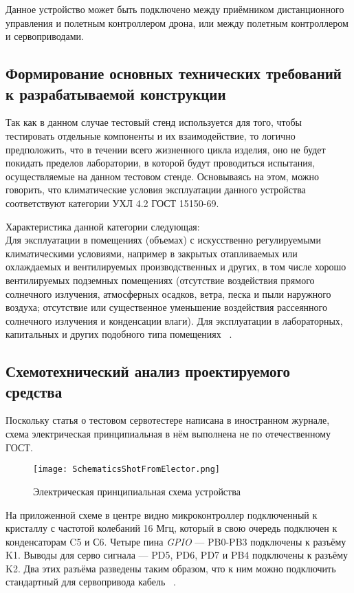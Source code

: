 Данное устройство может быть подключено между приёмником
дистанционного управления и полетным контроллером дрона, или между
полетным контроллером и сервоприводами.

\subsection{Формирование основных технических требований \\
  к разрабатываемой конструкции}

Так как в данном случае тестовый стенд используется для того, чтобы
тестировать отдельные компоненты и их взаимодействие, то логично
предположить, что в течении всего жизненного цикла изделия, оно не
будет покидать пределов лаборатории, в которой будут проводиться
испытания, осуществляемые на данном тестовом стенде.  Основываясь на
этом, можно говорить, что климатические условия эксплуатации данного
устройства соответствуют категории УХЛ 4.2 ГОСТ 15150-69.

Характеристика данной категории следующая:\\
Для эксплуатации в помещениях (объемах) с искусственно регулируемыми климатическими
условиями, например в закрытых отапливаемых или охлаждаемых и
вентилируемых производственных и других, в том числе хорошо
вентилируемых подземных помещениях (отсутствие воздействия прямого
солнечного излучения, атмосферных осадков, ветра, песка и пыли
наружного воздуха; отсутствие или существенное уменьшение воздействия
рассеянного солнечного излучения и конденсации влаги). Для эксплуатации
в лабораторных, капитальных и других подобного типа помещениях
~\cite{GOST-15150-69}.


\subsection{Схемотехнический анализ проектируемого средства}

Поскольку статья о тестовом сервотестере написана в иностранном журнале,
схема электрическая принципиальная в нём выполнена не по
отечественному ГОСТ.


\begin{figure}[h]
  \centering
  \texttt{[image: SchematicsShotFromElector.png]}
  \caption{Электрическая принципиальная схема устройства}
\end{figure}

На приложенной схеме в центре видно микроконтроллер подключенный к
кристаллу с частотой колебаний 16 Мгц, который в свою очередь
подключен к конденсаторам C5 и С6. Четыре пина \textit{GPIO} — PB0-PB3
подключены к разъёму K1. Выводы для серво сигнала — PD5, PD6, PD7 и
PB4 подключены к разъёму K2. Два этих разъёма разведены таким
образом, что к ним можно подключить стандартный для сервопривода
кабель ~\cite{Elector521}.

